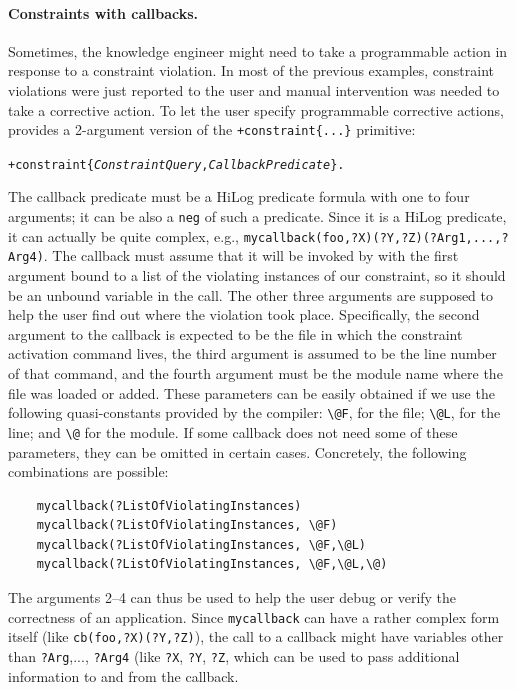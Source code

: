 \paragraph{Constraints with callbacks.}
Sometimes, the knowledge engineer might need to take a programmable action
in response to a constraint violation. In most of the
previous examples, constraint
violations were just reported to the user and manual intervention was needed
to take a corrective action. To let the user specify programmable
corrective actions, \ERGO provides a 2-argument version of
the \texttt{+constraint\{...\}} primitive:
\begin{alltt}
     +constraint\{\textnormal{\emph{ConstraintQuery},\emph{CallbackPredicate}}\}.
\end{alltt}
The callback predicate must be a HiLog predicate formula with one
to four
arguments; it can be also a \texttt{\bs{}neg} of such a predicate. 
Since it is a HiLog predicate, it can actually be quite complex, e.g.,
\texttt{mycallback(foo,?X)(?Y,?Z)(?Arg1,...,?Arg4)}.
The callback must assume that it will be invoked  by \ERGO with
the  first argument bound to a list of the violating instances of our
constraint, so it should be an unbound variable in the call.
The other three arguments are supposed to help the user find out where the
violation took place. Specifically, the second argument to the callback is
expected
to be the file in which the constraint activation
command lives, the third argument is assumed to be the line number of that
command, and the fourth argument must be the module name where the file was
loaded or added.
These parameters can be easily obtained if we use the following
quasi-constants provided by the \ERGO compiler: \verb|\@F|, for the file;
\verb|\@L|, for the line; and \verb|\@| for the module.
If some callback does not need some of these parameters,
they can be omitted in certain cases. Concretely, the following
combinations  are possible: 
\begin{verbatim}
    mycallback(?ListOfViolatingInstances)
    mycallback(?ListOfViolatingInstances, \@F)
    mycallback(?ListOfViolatingInstances, \@F,\@L)
    mycallback(?ListOfViolatingInstances, \@F,\@L,\@)
\end{verbatim}
The arguments 2--4 can thus be used to help the user debug or verify the
correctness of an application.
Since \texttt{mycallback} can have a rather complex form itself (like
\texttt{cb(foo,?X)(?Y,?Z)}), the call to a callback might have variables
other than \texttt{?Arg},..., \texttt{?Arg4}  (like \texttt{?X},
\texttt{?Y}, \texttt{?Z}, which can be used to pass additional information
to and from the callback.    


